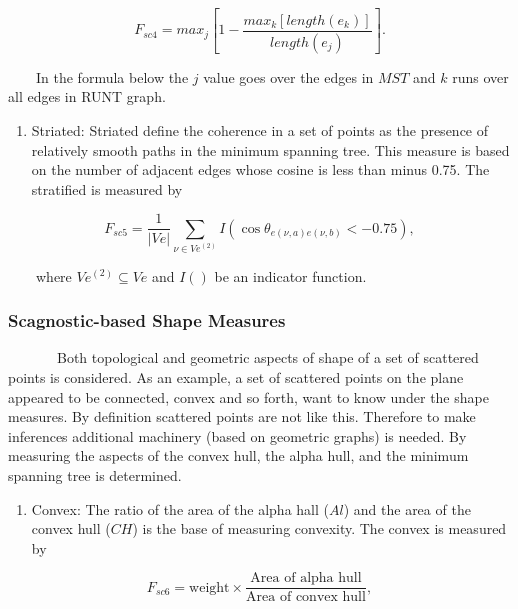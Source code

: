 \documentclass{article}
\begin{document}
\begin{equation}
    F_{sc4} = max_j[1-\frac{max_k[length(e_k)]}{length(e_j)}].
\end{equation}

~~~~In the formula below the \(j\) value goes over the edges in \(MST\)
and \(k\) runs over all edges in RUNT graph.

\begin{enumerate}
\def\labelenumi{\alph{enumi})}
\setcounter{enumi}{21}
\tightlist
\item
  Striated: Striated define the coherence in a set of points as the
  presence of relatively smooth paths in the minimum spanning tree. This
  measure is based on the number of adjacent edges whose cosine is less
  than minus 0.75. The stratified is measured by
\end{enumerate}

\begin{equation}
    F_{sc5} = \frac{1}{|Ve|}\sum_{\nu \in Ve^{(2)}}^{}I(\cos\theta_{e(\nu,a)e(\nu,b)}<-0.75),
\end{equation}

~~~~where \(Ve^{(2)} \subseteq Ve\) and \(I()\) be an indicator
function.

\hypertarget{scagnostic-based-shape-measures}{%
\subsubsection{Scagnostic-based Shape
Measures}\label{scagnostic-based-shape-measures}}

~~~~~~~Both topological and geometric aspects of shape of a set of
scattered points is considered. As an example, a set of scattered points
on the plane appeared to be connected, convex and so forth, want to know
under the shape measures. By definition scattered points are not like
this. Therefore to make inferences additional machinery (based on
geometric graphs) is needed. By measuring the aspects of the convex
hull, the alpha hull, and the minimum spanning tree is determined.

\begin{enumerate}
\def\labelenumi{\roman{enumi})}
\tightlist
\item
  Convex: The ratio of the area of the alpha hall (\(Al\)) and the area
  of the convex hull (\(CH\)) is the base of measuring convexity. The
  convex is measured by
\end{enumerate}

\begin{equation}
    F_{sc6} = \text{weight} \times \frac{\text{Area of alpha hull}}{\text{Area of convex hull}},
\end{equation}
\end{document}
